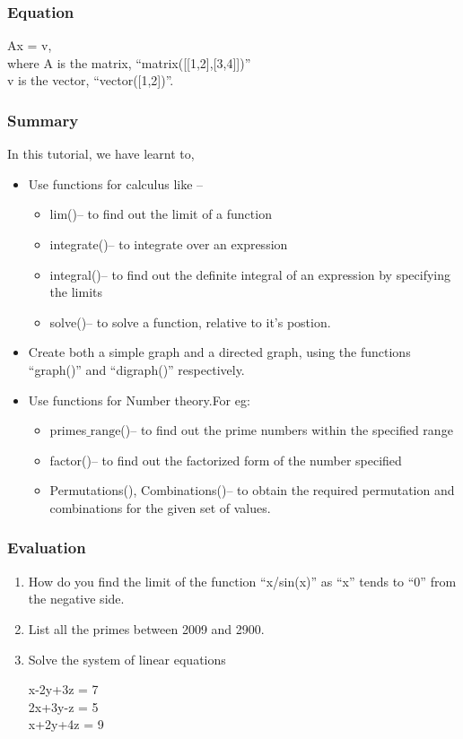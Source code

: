 \documentclass[presentation]{beamer}
\begin{document}
\begin{frame}
\frametitle{Equation}
\label{sec-4}

  Ax = v,\\
  where A is the matrix, ``matrix([[1,2],[3,4]])''\\
  v is the vector, ``vector([1,2])''. 
\end{frame}
\begin{frame}
\frametitle{Summary}
\label{sec-5}

In this tutorial, we have learnt to,  

\begin{itemize}
\item Use functions for calculus like --
\begin{itemize}
\item lim()-- to find out the limit of a function
\item integrate()-- to integrate over an expression
\item integral()-- to find out the definite integral of an 
      expression by specifying the limits
\item solve()-- to solve a function, relative to it's postion.
\end{itemize}
\item Create both a simple graph and a directed graph, using the 
    functions ``graph()'' and ``digraph()'' respectively.
\item Use functions for Number theory.For eg:
\begin{itemize}
\item primes$\_{\mathrm{range}}$()-- to find out the prime numbers within the 
      specified range
\item factor()-- to find out the factorized form of the number specified
\item Permutations(), Combinations()-- to obtain the required permutation 
      and combinations for the given set of values.
\end{itemize}
\end{itemize}
\end{frame}
\begin{frame}
\frametitle{Evaluation}
\label{sec-6}


\begin{enumerate}
\item How do you find the limit of the function ``x/sin(x)'' as ``x'' tends 
    to ``0'' from the negative side.
\vspace{3pt}
\item List all the primes between 2009 and 2900.
\vspace{3pt}
\item Solve the system of linear equations
     
    x-2y+3z = 7\\
    2x+3y-z = 5\\
    x+2y+4z = 9
\end{enumerate}
\end{frame}
\end{document}
